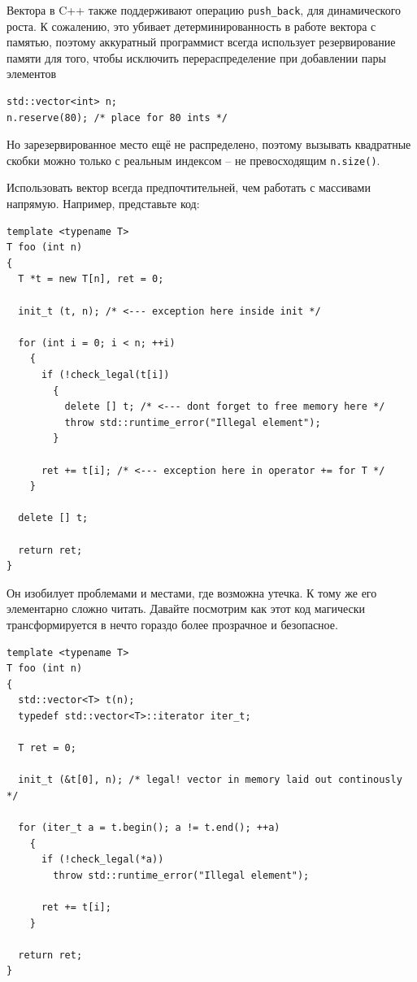 \documentclass[a4paper,12pt,oneside]{article}
\begin{document}
Вектора в C++ также поддерживают операцию \lstinline!push_back!, для динамического роста. К сожалению, это убивает детерминированность в работе вектора с памятью, поэтому аккуратный программист всегда использует резервирование памяти для того, чтобы исключить перераспределение при добавлении пары элементов

\begin{lstlisting}
std::vector<int> n;
n.reserve(80); /* place for 80 ints */
\end{lstlisting}

Но зарезервированное место ещё не распределено, поэтому вызывать квадратные скобки можно только с реальным индексом -- не превосходящим \lstinline!n.size()!.

Использовать вектор всегда предпочтительней, чем работать с массивами напрямую. Например, представьте код:

\begin{lstlisting}
template <typename T>
T foo (int n)
{
  T *t = new T[n], ret = 0;

  init_t (t, n); /* <--- exception here inside init */
  
  for (int i = 0; i < n; ++i)
    {
      if (!check_legal(t[i])
        {
          delete [] t; /* <--- dont forget to free memory here */
          throw std::runtime_error("Illegal element");
        }

      ret += t[i]; /* <--- exception here in operator += for T */
    }

  delete [] t;

  return ret;
}
\end{lstlisting}

Он изобилует проблемами и местами, где возможна утечка. К тому же его элементарно сложно читать. Давайте посмотрим как этот код магически трансформируется в нечто гораздо более прозрачное и безопасное.

\begin{lstlisting}
template <typename T>
T foo (int n)
{
  std::vector<T> t(n);
  typedef std::vector<T>::iterator iter_t;

  T ret = 0;

  init_t (&t[0], n); /* legal! vector in memory laid out continously */

  for (iter_t a = t.begin(); a != t.end(); ++a)
    {
      if (!check_legal(*a))
        throw std::runtime_error("Illegal element");

      ret += t[i];
    }

  return ret;  
}
\end{lstlisting}
\end{document}
